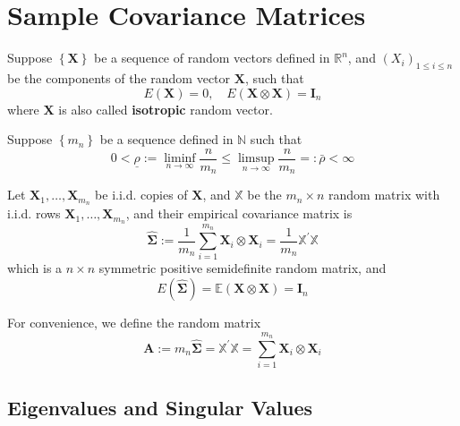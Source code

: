 \chapter{Sample Covariance Matrices}

Suppose $\left\{\mathbf{X}\right\}$ be a sequence of random vectors defined in $\mathbb{R}^{n}$, and $\left(X_{i}\right)_{1\leq i\leq n}$ be the components of the random vector $\mathbf{X}$, such that
\begin{equation*}
    E\left(\mathbf{X}\right)=0,\quad E\left(\mathbf{X}\otimes\mathbf{X}\right)=\mathbf{I}_{n}
\end{equation*}
where $\mathbf{X}$ is also called \textbf{isotropic} random vector.

Suppose $\left\{m_{n}\right\}$ be a sequence defined in $\mathbb{N}$ such that
\begin{equation*}
    0<\underline{\rho}:=\liminf_{n\rightarrow\infty}\frac{n}{m_{n}}\leq\limsup_{n\rightarrow\infty}\frac{n}{m_{n}}=:\bar{\rho}<\infty
\end{equation*}

Let $\mathbf{X}_{1},\ldots,\mathbf{X}_{m_{n}}$ be i.i.d. copies of $\mathbf{X}$, and $\mathbb{X}$ be the $m_{n}\times n$ random matrix with i.i.d. rows $\mathbf{X}_{1},\ldots,\mathbf{X}_{m_{n}}$, and their empirical covariance matrix is
\begin{equation*}
    \widehat{\boldsymbol{\Sigma}}:=\frac{1}{m_{n}}\sum_{i=1}^{m_{n}}\mathbf{X}_{i}\otimes\mathbf{X}_{i}=\frac{1}{m_{n}}\mathbb{X}^{\prime}\mathbb{X}
\end{equation*}
which is a $n\times n$ symmetric positive semidefinite random matrix, and
\begin{equation*}
    E\left(\widehat{\boldsymbol{\Sigma}}\right)=\mathbb{E}\left(\mathbf{X}\otimes\mathbf{X}\right)=\mathbf{I}_{n}
\end{equation*}

For convenience, we define the random matrix
\begin{equation*}
    \mathbf{A}:=m_{n}\widehat{\boldsymbol{\Sigma}}=\mathbb{X}^{\prime}\mathbb{X}=\sum_{i=1}^{m_{n}}\mathbf{X}_{i}\otimes\mathbf{X}_{i}
\end{equation*}

\section{Eigenvalues and Singular Values}

